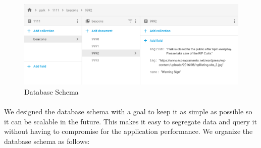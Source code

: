 \documentclass[12pt]{article}
\begin{document}
\begin{figure}[H]
	\centering
	\includegraphics[width=1\linewidth]{media/db.png}
	\caption{Database Schema}
	\label{fig:db}
\end{figure} 

\paragraph{} We designed the database schema with a goal to keep it as simple as possible so it can be scalable in the future. This makes it easy to segregate data and query it without having to compromise for the application performance. We organize the database schema as follows:
\end{document}
